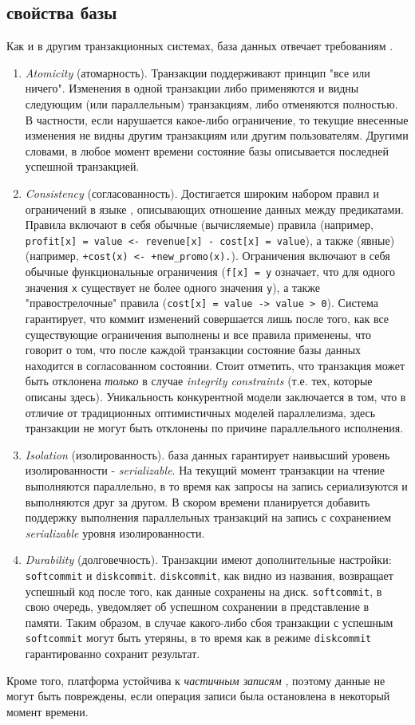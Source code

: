 \subsection{\acid свойства базы}
\label{sec:technology:acid}

Как и в другим транзакционных системах, база данных \LB отвечает требованиям \acid \cite{lb_acid}.

\begin{enumerate}
  \item \emph{Atomicity} (атомарность). Транзакции поддерживают принцип "все или ничего". Изменения в одной транзакции либо применяются и видны следующим (или параллельным) транзакциям, либо отменяются полностью. В частности, если нарушается какое-либо ограничение, то текущие внесенные изменения не видны другим транзакциям или другим пользователям. Другими словами, в любое момент времени состояние базы описывается последней успешной транзакцией.
  \item \emph{Consistency} (согласованность). Достигается широким набором правил и ограничений в языке \logiql, описывающих отношение данных между предикатами. Правила включают в себя обычные \idb (вычисляемые) правила (например, \lstinline{profit[x] = value <- revenue[x] - cost[x] = value}), а также \edb (явные) (например, \lstinline{+cost(x) <- +new_promo(x).}). Ограничения включают в себя обычные функциональные ограничения (\lstinline{f[x] = y} означает, что для одного значения \lstinline{x} существует не более одного значения \lstinline{y}), а также "правострелочные" правила (\lstinline{cost[x] = value -> value > 0}). Система гарантирует, что коммит изменений совершается лишь после того, как все существующие ограничения выполнены и все правила применены, что говорит о том, что после каждой транзакции состояние базы данных находится в согласованном состоянии. Стоит отметить, что транзакция может быть отклонена \emph{только} в случае \emph{integrity constraints} (т.е. тех, которые описаны здесь). Уникальность конкурентной модели \LB заключается в том, что в отличие от традиционных оптимистичных моделей параллелизма, здесь транзакции не могут быть отклонены по причине параллельного исполнения.
  \item \emph{Isolation} (изолированность). \LB база данных гарантирует наивысший уровень изолированности - \emph{serializable}. На текущий момент транзакции на чтение выполняются параллельно, в то время как запросы на запись сериализуются и выполняются друг за другом. В скором времени планируется добавить поддержку выполнения параллельных транзакций на запись с сохранением \emph{serializable} уровня изолированности.
  \item \emph{Durability} (долговечность). Транзакции имеют дополнительные настройки: \lstinline{softcommit} и \lstinline{diskcommit}. \lstinline{diskcommit}, как видно из названия, возвращает успешный код после того, как данные сохранены на диск. \lstinline{softcommit}, в свою очередь, уведомляет об успешном сохранении в представление в памяти. Таким образом, в случае какого-либо сбоя транзакции с успешным \lstinline{softcommit} могут быть утеряны, в то время как в режиме  \lstinline{diskcommit} гарантированно сохранит результат.
\end{enumerate}

Кроме того, платформа \LB устойчива к \emph{частичным записям} \cite{partial_writes_def}, поэтому данные не могут быть повреждены, если операция записи была остановлена в некоторый момент времени.
